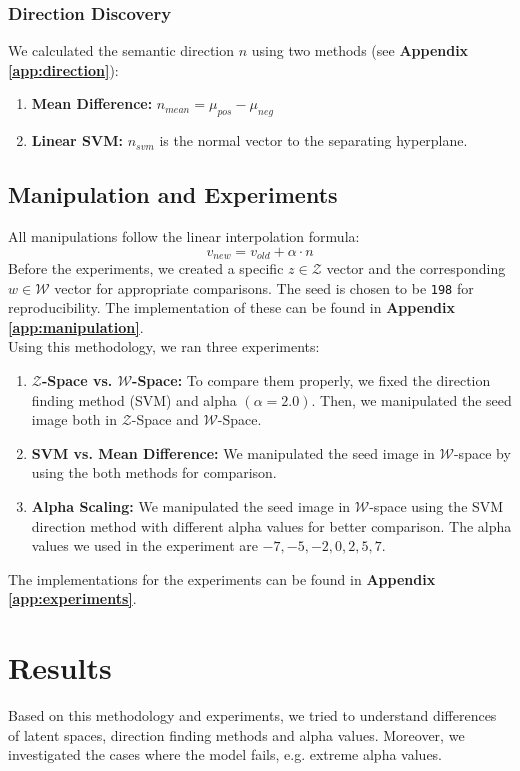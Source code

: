 \documentclass[12pt, a4paper]{article}
\begin{document}
\subsubsection{Direction Discovery}
We calculated the semantic direction $n$ using two methods (see \textbf{Appendix \ref{app:direction}}):
\begin{enumerate}
    \item \textbf{Mean Difference:} $n_{mean} = \mu_{pos} - \mu_{neg}$
    \item \textbf{Linear SVM:} $n_{svm}$ is the normal vector to the separating hyperplane.
\end{enumerate}

\subsection{Manipulation and Experiments}
All manipulations follow the linear interpolation formula:
\begin{equation*}
    v_{new} = v_{old} + \alpha \cdot n
\end{equation*}
Before the experiments, we created a specific $z \in \mathcal{Z}$ vector and the corresponding $w \in \mathcal{W}$ vector for appropriate comparisons. The seed is chosen to be \texttt{198} for reproducibility. The implementation of these can be found in \textbf{Appendix \ref{app:manipulation}}.
\vspace{2mm} \\
Using this methodology, we ran three experiments:
\begin{enumerate}
    \item \textbf{$\mathcal{Z}$-Space vs. $\mathcal{W}$-Space:} To compare them properly, we fixed the direction finding method (SVM) and alpha $(\alpha=2.0)$. Then, we manipulated the seed image both in $\mathcal{Z}$-Space and $\mathcal{W}$-Space.
    \item \textbf{SVM vs. Mean Difference:} We manipulated the seed image in $\mathcal{W}$-space by using the both methods for comparison.
    \item \textbf{Alpha Scaling:} We manipulated the seed image in $\mathcal{W}$-space using the SVM direction method with different alpha values for better comparison. The alpha values we used in the experiment are $-7,-5,-2,0,2,5,7$.
\end{enumerate}
The implementations for the experiments can be found in \textbf{Appendix \ref{app:experiments}}.

\section{Results}
Based on this methodology and experiments, we tried to understand differences of latent spaces, direction finding methods and alpha values. Moreover, we investigated the cases where the model fails, e.g. extreme alpha values.
\end{document}
